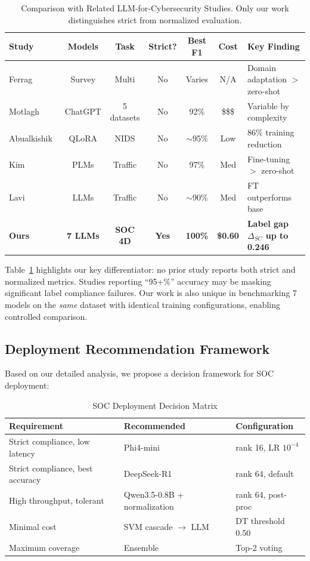 \documentclass[journal]{IEEEtran}
\begin{document}
\begin{table}[t]
\centering
\caption{Comparison with Related LLM-for-Cybersecurity Studies. Only our work distinguishes strict from normalized evaluation.}
\label{tab:comparison}
\begin{tabular}{lcccccl}
\toprule
\textbf{Study} & \textbf{Models} & \textbf{Task} & \textbf{Strict?} & \textbf{Best F1} & \textbf{Cost} & \textbf{Key Finding} \\
\midrule
Ferrag~\cite{ferrag2024} & Survey & Multi & No & Varies & N/A & Domain adaptation $>$ zero-shot \\
Motlagh~\cite{motlagh2024} & ChatGPT & 5 datasets & No & 92\% & \$\$\$ & Variable by complexity \\
Abualkishik~\cite{abualkishik2025} & QLoRA & NIDS & No & $\sim$95\% & Low & 86\% training reduction \\
Kim~\cite{kim2024} & PLMs & Traffic & No & 97\% & Med & Fine-tuning $>$ zero-shot \\
Lavi~\cite{lavi2024} & LLMs & Traffic & No & $\sim$90\% & Med & FT outperforms base \\
\midrule
\textbf{Ours} & \textbf{7 LLMs} & \textbf{SOC 4D} & \textbf{Yes} & \textbf{100\%} & \textbf{\$0.60} & \textbf{Label gap $\Delta_{SC}$ up to 0.246} \\
\bottomrule
\end{tabular}
\end{table}

Table~\ref{tab:comparison} highlights our key differentiator: no prior study reports both strict and normalized metrics. Studies reporting ``95+\%'' accuracy may be masking significant label compliance failures. Our work is also unique in benchmarking 7 models on the \emph{same} dataset with identical training configurations, enabling controlled comparison.

\subsection{Deployment Recommendation Framework}
Based on our detailed analysis, we propose a decision framework for SOC deployment:

\begin{table}[!ht]
\centering
\caption{SOC Deployment Decision Matrix}
\label{tab:deploy}
\begin{tabular}{p{2.5cm}p{2cm}p{2.5cm}}
\toprule
\textbf{Requirement} & \textbf{Recommended} & \textbf{Configuration} \\
\midrule
Strict compliance, low latency & Phi4-mini & rank 16, LR $10^{-4}$ \\
Strict compliance, best accuracy & DeepSeek-R1 & rank 64, default \\
High throughput, tolerant & Qwen3.5-0.8B + normalization & rank 64, post-proc \\
Minimal cost & SVM cascade $\to$ LLM & DT threshold 0.50 \\
Maximum coverage & Ensemble & Top-2 voting \\
\bottomrule
\end{tabular}
\end{table}
\end{document}
